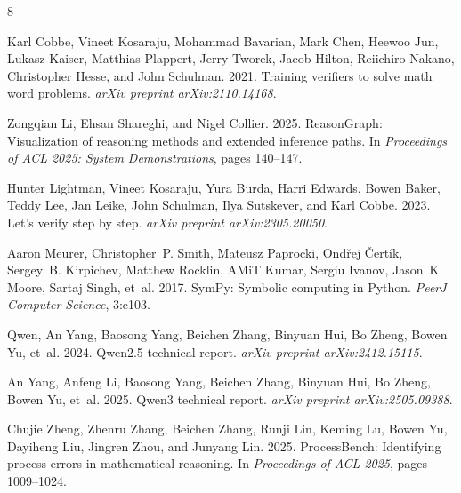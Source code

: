 \documentclass[11pt]{article}
\begin{document}
\begin{thebibliography}{8}

Karl Cobbe, Vineet Kosaraju, Mohammad Bavarian, Mark Chen, Heewoo Jun, Lukasz
Kaiser, Matthias Plappert, Jerry Tworek, Jacob Hilton, Reiichiro Nakano,
Christopher Hesse, and John Schulman. 2021.
\newblock Training verifiers to solve math word problems.
\newblock \emph{arXiv preprint arXiv:2110.14168}.

Zongqian Li, Ehsan Shareghi, and Nigel Collier. 2025.
\newblock ReasonGraph: Visualization of reasoning methods and extended inference
paths.
\newblock In \emph{Proceedings of ACL 2025: System Demonstrations}, pages 140--147.

Hunter Lightman, Vineet Kosaraju, Yura Burda, Harri Edwards, Bowen Baker, Teddy
Lee, Jan Leike, John Schulman, Ilya Sutskever, and Karl Cobbe. 2023.
\newblock Let's verify step by step.
\newblock \emph{arXiv preprint arXiv:2305.20050}.

Aaron Meurer, Christopher~P. Smith, Mateusz Paprocki, Ond\v{r}ej \v{C}ert\'{i}k,
Sergey~B. Kirpichev, Matthew Rocklin, AMiT Kumar, Sergiu Ivanov, Jason~K. Moore,
Sartaj Singh, et~al. 2017.
\newblock SymPy: Symbolic computing in Python.
\newblock \emph{PeerJ Computer Science}, 3:e103.

Qwen, An Yang, Baosong Yang, Beichen Zhang, Binyuan Hui, Bo Zheng, Bowen Yu,
et~al. 2024.
\newblock Qwen2.5 technical report.
\newblock \emph{arXiv preprint arXiv:2412.15115}.

An Yang, Anfeng Li, Baosong Yang, Beichen Zhang, Binyuan Hui, Bo Zheng, Bowen Yu,
et~al. 2025.
\newblock Qwen3 technical report.
\newblock \emph{arXiv preprint arXiv:2505.09388}.

Chujie Zheng, Zhenru Zhang, Beichen Zhang, Runji Lin, Keming Lu, Bowen Yu,
Dayiheng Liu, Jingren Zhou, and Junyang Lin. 2025.
\newblock ProcessBench: Identifying process errors in mathematical reasoning.
\newblock In \emph{Proceedings of ACL 2025}, pages 1009--1024.

\end{thebibliography}
\end{document}
